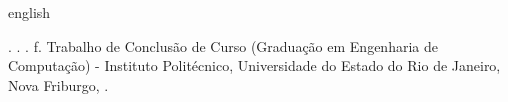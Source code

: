 
\begin{resumo}[Abstract]
\begin{otherlanguage*}{english}
\begin{SingleSpace}

\noindent
\entradaAutor{}. \textit{\englishTitle{}}. \the\year. \pageref{LastPage} f. \foreignlanguage{brazil}{Trabalho de Conclusão de Curso (Graduação em Engenharia de Computação)} - Instituto Politécnico, Universidade do Estado do Rio de Janeiro, Nova Friburgo, \the\year.
\vspace{\onelineskip}


\end{SingleSpace}
\end{otherlanguage*}
\end{resumo}
